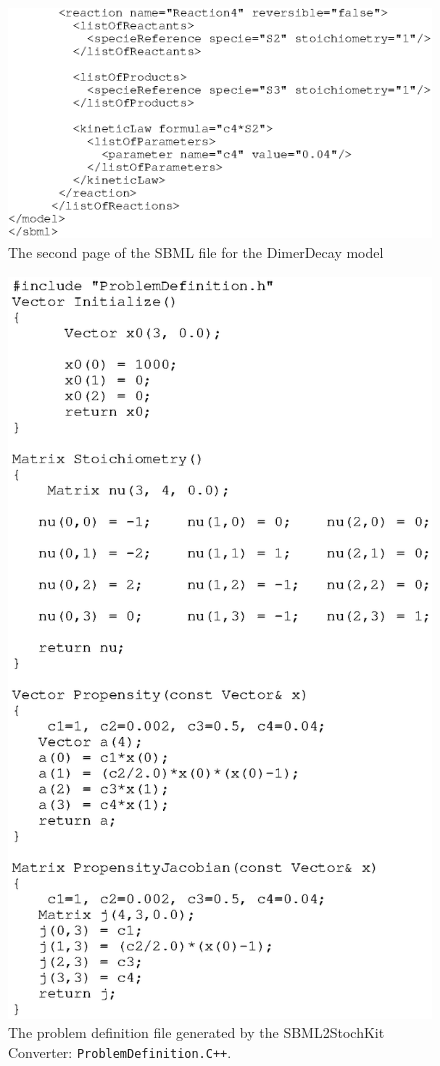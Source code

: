\documentclass[12pt]{article}
\newcommand{\cpp}{\texttt{C++}}%
\newcommand{\api}[1]{\texttt{#1}}
\begin{document}
\begin{figure}[htbp]
\centering \includegraphics{DimerXml2.eps}
\caption{The second page of the SBML file for the DimerDecay model }
\label{dimersbml2}
\end{figure}


\begin{figure}[htbp]
\centering \includegraphics{ProblemD.eps}
\caption{The  problem definition file generated by the SBML2StochKit Converter:
         \api{ProblemDefinition.\cpp}.}
\label{dimerprolem}
\end{figure}
\end{document}
